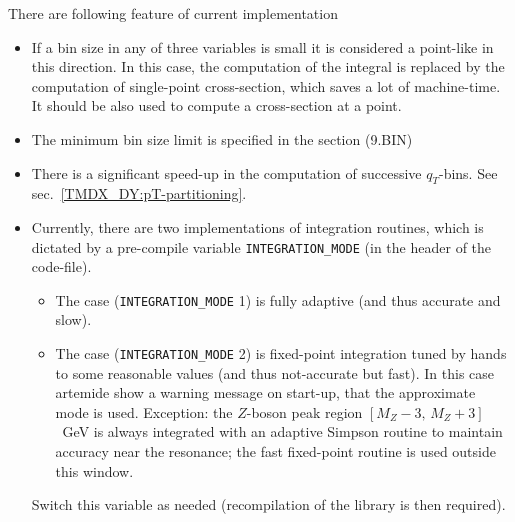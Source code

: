 \documentclass[prd,nofootinbib,eqsecnum,final]{revtex4}
\renewcommand{\(}{\left(}
\renewcommand{\)}{\right)}
\renewcommand{\[}{\left[}
\renewcommand{\]}{\right]}
\begin{document}
There are following feature of current implementation
\begin{itemize}
\item If a bin size in any of three variables is small it is considered a point-like in this direction. In this case, the computation of the integral is replaced by the computation of single-point cross-section, which saves a lot of machine-time. It should be also used to compute a cross-section at a point.
\item The minimum bin size limit is specified in the section (9.BIN)
\item There is a significant speed-up in the computation of successive $q_T$-bins. See sec.~\ref{TMDX_DY:pT-partitioning}.
\item Currently, there are two implementations of integration routines, which is dictated by a pre-compile variable \texttt{INTEGRATION\_MODE} (in the header of the code-file). 
\begin{itemize}
\item The case (\texttt{INTEGRATION\_MODE} 1) is fully adaptive (and thus accurate and slow).
\item The case (\texttt{INTEGRATION\_MODE} 2) is fixed-point integration tuned by hands to some reasonable values (and thus not-accurate but fast). In this case artemide show a warning message on start-up, that the approximate mode is used. Exception: the $Z$-boson peak region $[M_Z-3,\,M_Z+3]$~GeV is always integrated with an adaptive Simpson routine to maintain accuracy near the resonance; the fast fixed-point routine is used outside this window.
\end{itemize}
Switch this variable as needed (recompilation of the library is then required).
\end{itemize}
\end{document}
